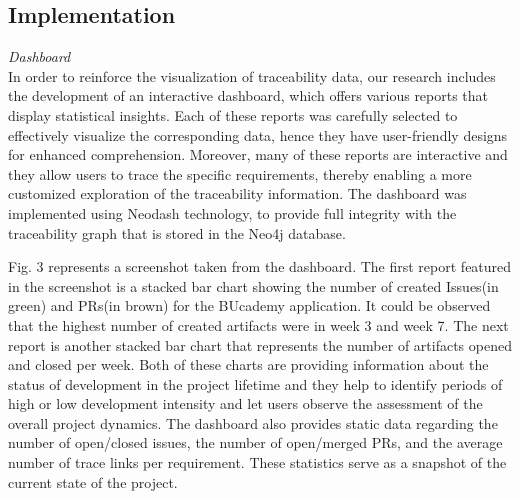 \documentclass[conference]{IEEEtran}
\begin{document}


\subsection{Implementation}
\label{sec:impl}


\emph{Dashboard}
\\

In order to reinforce the visualization of traceability data, our research includes the development of an interactive dashboard, which offers various reports that display statistical insights. Each of these reports was carefully selected to effectively visualize the corresponding data, hence they have user-friendly designs for enhanced comprehension. Moreover, many of these reports are interactive and they allow users to trace the specific requirements, thereby enabling a more customized exploration of the traceability information.
The dashboard was implemented using Neodash technology, to provide full integrity with the traceability graph that is stored in the Neo4j database.

Fig. 3 represents a screenshot taken from the dashboard. The first report featured in the screenshot is a stacked bar chart showing the number of created Issues(in green) and PRs(in brown) for the BUcademy application. It could be observed that the highest number of created artifacts were in week 3 and week 7. The next report is another stacked bar chart that represents the number of artifacts opened and closed per week. Both of these charts are providing information about the status of development in the project lifetime and they help to identify periods of high or low development intensity and let users observe the assessment of the overall project dynamics.
The dashboard also provides static data regarding the number of open/closed issues, the number of open/merged PRs, and the average number of trace links per requirement. These statistics serve as a snapshot of the current state of the project.
\end{document}
